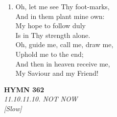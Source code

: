 \documentclass[11pt,a4paper]{article}
\begin{document}
\begin{enumerate}
    \item Oh, let me see Thy foot-marks, \\
        And in them plant mine own: \\
        My hope to follow duly \\
        Is in Thy strength alone. \\
        Oh, guide me, call me, draw me, \\
        Uphold me to the end; \\
        And then in heaven receive me, \\
        My Saviour and my Friend!

\end{enumerate}

\newpage
\begin{center}
    {\Large \textbf{HYMN 362}}
    \\
    \textit{11.10.11.10. NOT NOW}
    \\
    \textit{\small [Slow]}
\end{center}
\vspace{1em}
\end{document}
